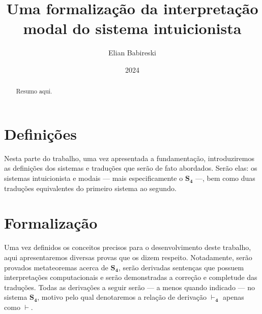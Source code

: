 \documentclass[12pt]{report}
\newcommand{\entails}{\mathrel{\vdash}}
\begin{document}
    \title{Uma formalização da interpretação modal do sistema intuicionista}
    \author{Elian Babireski}
    \date{2024}

    \maketitle

    \begin{abstract}
        Resumo aqui.
    \end{abstract}

    \tableofcontents

    
    
    

    \chapter{Definições}

        Nesta parte do trabalho, uma vez apresentada a fundamentação, introduziremos as definições dos sistemas e traduções que serão de fato abordados. Serão elas: os sistemas intuicionista  e modais --- mais especificamente o $\mathbf{S_4}$ ---, bem como duas traduções equivalentes do primeiro sistema ao segundo.

        
        
        

    \chapter{Formalização}
        Uma vez definidos os conceitos precisos para o desenvolvimento deste trabalho, aqui apresentaremos diversas provas que os dizem respeito. Notadamente, serão provados metateoremas acerca de $\mathbf{S_4}$, serão derivadas sentenças que possuem interpretações computacionais e serão demonstradas a correção e completude das traduções. Todas as derivações a seguir serão --- a menos quando indicado --- no sistema $\mathbf{S_4}$, motivo pelo qual denotaremos a relação de derivação $\entails_{\mathbf{4}}$ apenas como $\entails$.

        
        
        
        
        

    
    
\end{document}
